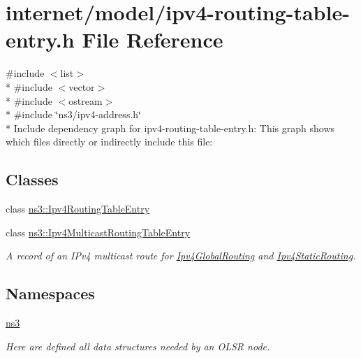 \hypertarget{ipv4-routing-table-entry_8h}{}\section{internet/model/ipv4-\/routing-\/table-\/entry.h File Reference}
\label{ipv4-routing-table-entry_8h}
{\ttfamily \#include $<$list$>$}\\*
{\ttfamily \#include $<$vector$>$}\\*
{\ttfamily \#include $<$ostream$>$}\\*
{\ttfamily \#include \char`\"{}ns3/ipv4-\/address.\+h\char`\"{}}\\*
Include dependency graph for ipv4-\/routing-\/table-\/entry.h\+:
This graph shows which files directly or indirectly include this file\+:
\subsection*{Classes}
\begin{DoxyCompactItemize}
\item 
class \hyperlink{classns3_1_1Ipv4RoutingTableEntry}{ns3\+::\+Ipv4\+Routing\+Table\+Entry}
\item 
class \hyperlink{classns3_1_1Ipv4MulticastRoutingTableEntry}{ns3\+::\+Ipv4\+Multicast\+Routing\+Table\+Entry}
\begin{DoxyCompactList}\small\item\em A record of an I\+Pv4 multicast route for \hyperlink{classns3_1_1Ipv4GlobalRouting}{Ipv4\+Global\+Routing} and \hyperlink{classns3_1_1Ipv4StaticRouting}{Ipv4\+Static\+Routing}. \end{DoxyCompactList}\end{DoxyCompactItemize}
\subsection*{Namespaces}
\begin{DoxyCompactItemize}
\item 
 \hyperlink{namespacens3}{ns3}
\begin{DoxyCompactList}\small\item\em Here are defined all data structures needed by an O\+L\+SR node. \end{DoxyCompactList}\end{DoxyCompactItemize}
